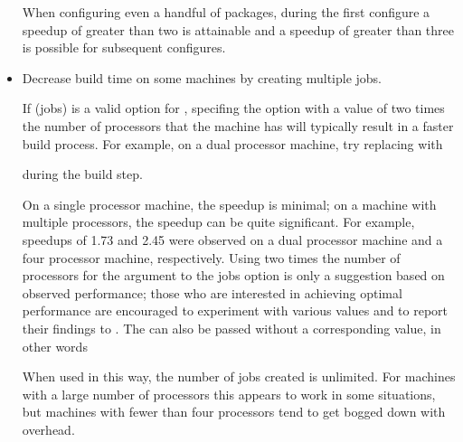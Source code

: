 \begin{itemize}
When configuring even a handful of 
packages, during the first configure a speedup of greater
than two is attainable and a speedup of greater than three is possible for 
subsequent configures.

\item Decrease build time on some machines by creating multiple jobs.

If  (jobs) is a valid option for ,
specifing the  option with a value of two times the number 
of processors that the machine has will typically result in a faster build 
process.  For example, on a dual processor machine, try replacing 
 with 


during the build step.

On a single processor machine, the speedup is minimal; on a machine with 
multiple processors, the speedup can be quite significant.  For example, 
speedups of 1.73 and 2.45 were observed on a dual processor machine and a four 
processor machine, respectively.  Using two times the number of processors for 
the argument to the jobs option is only a suggestion based on observed 
performance; those who are interested in achieving optimal performance are
encouraged to experiment with various values and to report 
their findings to .  The 
 can also be passed without a corresponding value, in other 
words


When used in this way, the number of jobs created is unlimited.  For machines 
with a large number of processors this appears to work in some situations, but
machines with fewer than four processors tend to get bogged down with 
overhead.

\end{itemize}

